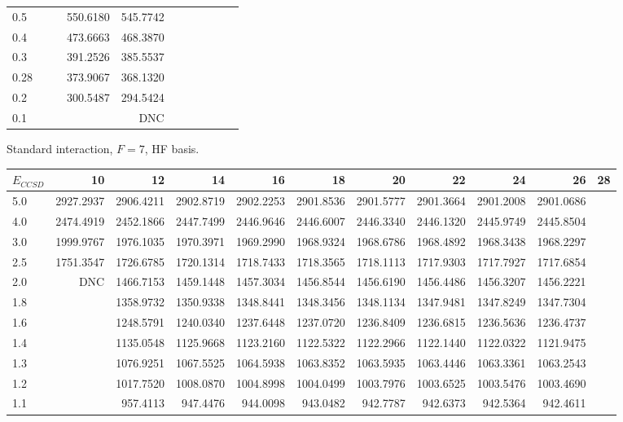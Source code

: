 \begin{landscape}
\begin{table}
\begin{center}
\begin{tabular}{l|rrrrrrrrrr}
0.5 & 			& 			& 550.6180 & 545.7742  \\ 
0.4 & 			& 			& 473.6663 & 468.3870  \\ 
0.3 & 			& 			& 391.2526 & 385.5537  \\ 
0.28 & 			& 			& 373.9067 & 368.1320  \\ 
0.2 & 			& 			& 300.5487 & 294.5424  \\ 
0.1 & 			& 			& 			& DNC  \\ 
\hline \hline
\end{tabular}
\end{center}
\end{table}
\begin{table}
\begin{center}
Standard interaction, $F=7$, HF basis.\\
\begin{tabular}{l|rrrrrrrrrr}
\hline 
$E_{CCSD}$ & 10 & 12 & 14 & 16 & 18 & 20 & 22 & 24 & 26 & 28 \\
\hline \hline
5.0 & 2927.2937 & 2906.4211 & 2902.8719 & 2902.2253 & 2901.8536 & 2901.5777 & 2901.3664 & 2901.2008 & 2901.0686 & \\ 
4.0 & 2474.4919 & 2452.1866 & 2447.7499 & 2446.9646 & 2446.6007 & 2446.3340 & 2446.1320 & 2445.9749 & 2445.8504 & \\ 
3.0 & 1999.9767 & 1976.1035 & 1970.3971 & 1969.2990 & 1968.9324 & 1968.6786 & 1968.4892 & 1968.3438 & 1968.2297 & \\ 
2.5 & 1751.3547 & 1726.6785 & 1720.1314 & 1718.7433 & 1718.3565 & 1718.1113 & 1717.9303 & 1717.7927 & 1717.6854 & \\ 
2.0 &       DNC & 1466.7153 & 1459.1448 & 1457.3034 & 1456.8544 & 1456.6190 & 1456.4486 & 1456.3207 & 1456.2221 & \\ 
1.8 & 			& 1358.9732 & 1350.9338 & 1348.8441 & 1348.3456 & 1348.1134 & 1347.9481 & 1347.8249 & 1347.7304 & \\ 
1.6 & 			& 1248.5791 & 1240.0340 & 1237.6448 & 1237.0720 & 1236.8409 & 1236.6815 & 1236.5636 & 1236.4737 & \\ 
1.4 & 			& 1135.0548 & 1125.9668 & 1123.2160 & 1122.5322 & 1122.2966 & 1122.1440 & 1122.0322 & 1121.9475 & \\ 
1.3 & 			& 1076.9251 & 1067.5525 & 1064.5938 & 1063.8352 & 1063.5935 & 1063.4446 & 1063.3361 & 1063.2543 & \\ 
1.2 & 			& 1017.7520 & 1008.0870 & 1004.8998 & 1004.0499 & 1003.7976 & 1003.6525 & 1003.5476 & 1003.4690 & \\ 
1.1 & 			&  957.4113 &  947.4476 &  944.0098 &  943.0482 &  942.7787 &  942.6373 &  942.5364 &  942.4611 & \\ 

\end{tabular}
\end{center}
\end{table}
\end{landscape}
